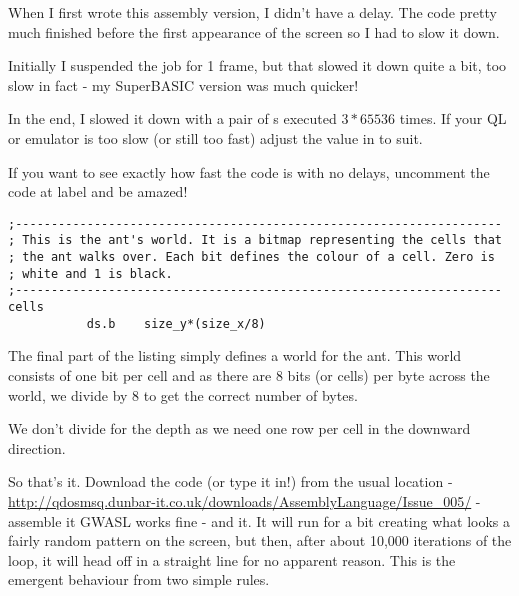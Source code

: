 When I first wrote this assembly version, I didn't have a delay. The code pretty much finished before the first appearance of the screen so I had to slow it down. 

Initially I suspended the job for 1 frame, but that slowed it down quite a bit, too slow in fact - my SuperBASIC version was much quicker! 

In the end, I slowed it down with a pair of s executed $3 * 65536$ times. If your QL or emulator is too slow (or still too fast) adjust the value in  to suit.

If you want to see exactly how fast the code is with no delays, uncomment the code at label  and be amazed!

\begin{lstlisting}[firstnumber=last,caption={Langtons Ant - The Ant's World}]
;--------------------------------------------------------------------
; This is the ant's world. It is a bitmap representing the cells that
; the ant walks over. Each bit defines the colour of a cell. Zero is
; white and 1 is black.
;--------------------------------------------------------------------
cells
           ds.b    size_y*(size_x/8)
\end{lstlisting}

The final part of the listing simply defines a world for the ant. This world consists of one bit per cell and as there are 8 bits (or cells) per byte across the world, we divide by 8 to get the correct number of bytes.

We don't divide for the depth as we need one row per cell in the downward direction.

So that's it. Download the code (or type it in!) from the usual location - \href{http://qdosmsq.dunbar-it.co.uk/downloads/AssemblyLanguage/Issue\_005/}{http://qdosmsq.dunbar-it.co.uk/downloads/AssemblyLanguage/Issue\_005/} - assemble it GWASL works fine - and  it. It will run for a bit creating what looks a fairly random pattern on the screen, but then, after about 10,000 iterations of the  loop, it will head off in a straight line for no apparent reason. This is the emergent behaviour from two simple rules.
